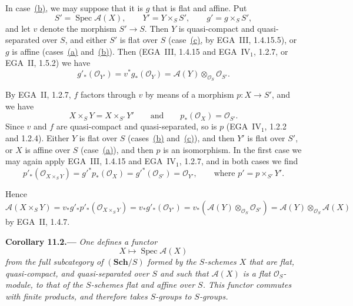 In case~\hyperref[concl:sga3-VIB-11.1-b]{\textup{(b)}}, we may
suppose that it is \(g\) that is flat and affine. Put
\[
  S'=\operatorname{Spec}\mathcal A(X),\qquad
  Y'=Y\times_SS',\qquad
  g'=g\times_SS',
\]
and let \(v\) denote the morphism \(S'\to S\). Then \(Y\) is
quasi-compact and quasi-separated over \(S\), and either \(S'\)
is flat over \(S\)
\textup{(case~\hyperref[concl:sga3-VIB-11.1-c]{\textup{(c)}}, by
EGA~III, 1.4.15.5)}, or \(g\) is affine
\textup{(cases~\hyperref[concl:sga3-VIB-11.1-a]{\textup{(a)}}
and~\hyperref[concl:sga3-VIB-11.1-b]{\textup{(b)}})}. Then
\textup{(EGA~III, 1.4.15 and EGA~IV\(_1\), 1.2.7, or EGA~II,
1.5.2)} we have
\[
  g'_*(\mathcal O_{Y'})
    =v^*g_*(\mathcal O_Y)
    =\mathcal A(Y)\otimes_{\mathcal O_S}\mathcal O_{S'}.
\]

By EGA~II, 1.2.7, \(f\) factors through \(v\) by means of a
morphism \(p:X\to S'\), and we have
\[
  X\times_SY=X\times_{S'}Y'
  \qquad\text{and}\qquad
  p_*(\mathcal O_X)=\mathcal O_{S'}.
\]
Since \(v\) and \(f\) are quasi-compact and quasi-separated, so
is \(p\) \textup{(EGA~IV\(_1\), 1.2.2 and 1.2.4)}. Either \(Y\)
is flat over \(S\)
\textup{(cases~\hyperref[concl:sga3-VIB-11.1-b]{\textup{(b)}}
and~\hyperref[concl:sga3-VIB-11.1-c]{\textup{(c)}})}, and then
\(Y'\) is flat over \(S'\), or \(X\) is affine over \(S\)
\textup{(case~\hyperref[concl:sga3-VIB-11.1-a]{\textup{(a)}})},
and then \(p\) is an isomorphism. In the first case we may
again apply EGA~III, 1.4.15 and EGA~IV\(_1\), 1.2.7, and in
both cases we find
\[
  p'_*(\mathcal O_{X\times_SY})
    =g'^*p_*(\mathcal O_X)
    =g'^*(\mathcal O_{S'})
    =\mathcal O_{Y'},
  \qquad\text{where }p'=p\times_{S'}Y'.
\]

Hence
\[
  \mathcal A(X\times_SY)
    =v_*g'_*p'_*(\mathcal O_{X\times_SY})
    =v_*g'_*(\mathcal O_{Y'})
    =v_*(\mathcal A(Y)\otimes_{\mathcal O_S}\mathcal O_{S'})
    =\mathcal A(Y)\otimes_{\mathcal O_S}\mathcal A(X)
\]
by EGA~II, 1.4.7.

\medskip
{}\label{cor:sga3-VIB-11.2}%
\noindent\textbf{Corollary 11.2.---}
\emph{One defines a functor}
\[
  X\longmapsto\operatorname{Spec}\mathcal A(X)
\]
\emph{from the full subcategory of
\((\mathbf{Sch}/S)\) formed by the \(S\)-schemes \(X\) that
are flat, quasi-compact, and quasi-separated over \(S\) and
such that \(\mathcal A(X)\) is a flat
\(\mathcal O_S\)-module, to that of the \(S\)-schemes flat and
affine over \(S\). This functor commutes with finite products,
and therefore takes \(S\)-groups to \(S\)-groups.}

